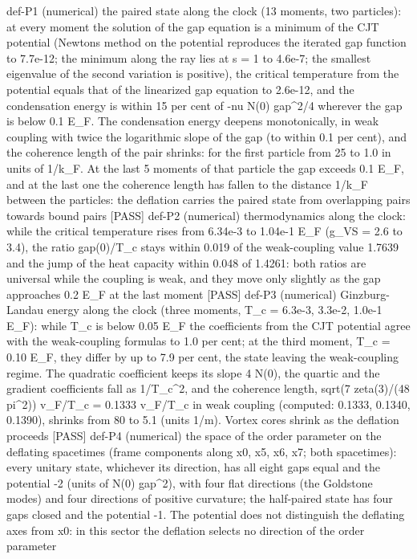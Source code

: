 \documentclass[
  10pt,
]{article}
\newenvironment{Shaded}{}{}
\newcommand{\NormalTok}[1]{#1}
\begin{document}
\begin{Shaded}
\begin{Highlighting}[]
\NormalTok{[PASS] def{-}P1  (numerical) the paired state along the clock (13 moments, two particles): at every moment the solution of the gap equation is a minimum of the CJT potential (Newton\textquotesingle{}s method on the potential reproduces the iterated gap function to 7.7e{-}12; the minimum along the ray lies at s = 1 to 4.6e{-}7; the smallest eigenvalue of the second variation is positive), the critical temperature from the potential equals that of the linearized gap equation to 2.6e{-}12, and the condensation energy is within 15 per cent of {-}nu N(0) gap\^{}2/4 wherever the gap is below 0.1 E\_F. The condensation energy deepens monotonically, in weak coupling with twice the logarithmic slope of the gap (to within 0.1 per cent), and the coherence length of the pair shrinks: for the first particle from 25 to 1.0 in units of 1/k\_F. At the last 5 moments of that particle the gap exceeds 0.1 E\_F, and at the last one the coherence length has fallen to the distance 1/k\_F between the particles: the deflation carries the paired state from overlapping pairs towards bound pairs}
\NormalTok{[PASS] def{-}P2  (numerical) thermodynamics along the clock: while the critical temperature rises from 6.34e{-}3 to 1.04e{-}1 E\_F (g\_VS = 2.6 to 3.4), the ratio gap(0)/T\_c stays within 0.019 of the weak{-}coupling value 1.7639 and the jump of the heat capacity within 0.048 of 1.4261: both ratios are universal while the coupling is weak, and they move only slightly as the gap approaches 0.2 E\_F at the last moment}
\NormalTok{[PASS] def{-}P3  (numerical) Ginzburg{-}Landau energy along the clock (three moments, T\_c = 6.3e{-}3, 3.3e{-}2, 1.0e{-}1 E\_F): while T\_c is below 0.05 E\_F the coefficients from the CJT potential agree with the weak{-}coupling formulas to 1.0 per cent; at the third moment, T\_c = 0.10 E\_F, they differ by up to 7.9 per cent, the state leaving the weak{-}coupling regime. The quadratic coefficient keeps its slope 4 N(0), the quartic and the gradient coefficients fall as 1/T\_c\^{}2, and the coherence length, sqrt(7 zeta(3)/(48 pi\^{}2)) v\_F/T\_c = 0.1333 v\_F/T\_c in weak coupling (computed: 0.1333, 0.1340, 0.1390), shrinks from 80 to 5.1 (units 1/m). Vortex cores shrink as the deflation proceeds}
\NormalTok{[PASS] def{-}P4  (numerical) the space of the order parameter on the deflating spacetimes (frame components along x0, x5, x6, x7; both spacetimes): every unitary state, whichever its direction, has all eight gaps equal and the potential {-}2 (units of N(0) gap\^{}2), with four flat directions (the Goldstone modes) and four directions of positive curvature; the half{-}paired state has four gaps closed and the potential {-}1. The potential does not distinguish the deflating axes from x0: in this sector the deflation selects no direction of the order parameter}

\end{Highlighting}
\end{Shaded}
\end{document}
